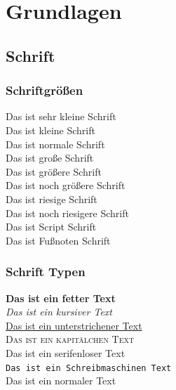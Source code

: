 \section{Grundlagen}

\subsection{Schrift}
\label{sec:schrift}

\subsubsection{Schriftgrößen}
\label{sec:schriftgroessen}
\tiny Das ist sehr kleine Schrift\\
\small Das ist kleine Schrift\\
\normalsize Das ist normale Schrift\\
\large Das ist große Schrift\\
\Large Das ist größere Schrift\\
\LARGE Das ist noch größere Schrift\\
\huge Das ist riesige Schrift\\
\Huge Das ist noch riesigere Schrift\\
\scriptsize Das ist Script Schrift\\
\footnotesize Das ist Fußnoten Schrift
\normalsize

\subsubsection{Schrift Typen}
\label{sec:Schrift Typen}
\textbf{Das ist ein fetter Text}\\
\textit{Das ist ein kursiver Text}\\
\underline{Das ist ein unterstrichener Text}\\
\textsc{Das ist ein kapitälchen Text}\\
\textsf{Das ist ein serifenloser Text}\\
\texttt{Das ist ein Schreibmaschinen Text}\\
\textnormal{Das ist ein normaler Text}

